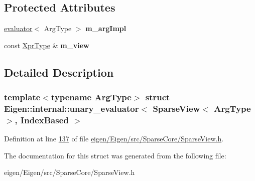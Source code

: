 \subsection*{Protected Attributes}
\begin{DoxyCompactItemize}
\item 
\mbox{\label{struct_eigen_1_1internal_1_1unary__evaluator_3_01_sparse_view_3_01_arg_type_01_4_00_01_index_based_01_4_ae83b93edf695697b56e8b93920a49731}} 
\hyperlink{struct_eigen_1_1internal_1_1evaluator}{evaluator}$<$ Arg\+Type $>$ {\bfseries m\+\_\+arg\+Impl}
\item 
\mbox{\label{struct_eigen_1_1internal_1_1unary__evaluator_3_01_sparse_view_3_01_arg_type_01_4_00_01_index_based_01_4_a2fc5796ccaf976147a92a58db7ce0d90}} 
const \hyperlink{group___sparse_core___module_class_eigen_1_1_sparse_view}{Xpr\+Type} \& {\bfseries m\+\_\+view}
\end{DoxyCompactItemize}


\subsection{Detailed Description}
\subsubsection*{template$<$typename Arg\+Type$>$\newline
struct Eigen\+::internal\+::unary\+\_\+evaluator$<$ Sparse\+View$<$ Arg\+Type $>$, Index\+Based $>$}



Definition at line \hyperlink{eigen_2_eigen_2src_2_sparse_core_2_sparse_view_8h_source_l00137}{137} of file \hyperlink{eigen_2_eigen_2src_2_sparse_core_2_sparse_view_8h_source}{eigen/\+Eigen/src/\+Sparse\+Core/\+Sparse\+View.\+h}.



The documentation for this struct was generated from the following file\+:\begin{DoxyCompactItemize}
\item 
eigen/\+Eigen/src/\+Sparse\+Core/\+Sparse\+View.\+h\end{DoxyCompactItemize}
